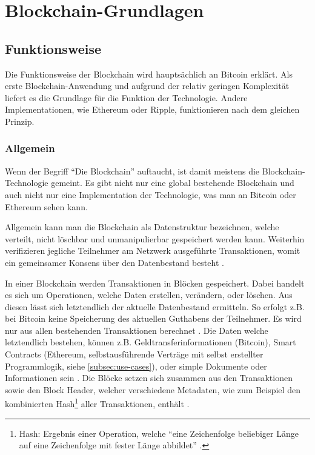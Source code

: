 \chapter{Blockchain-Grundlagen}
\label{cha:grundlagen}

\section{Funktionsweise}
Die Funktionsweise der Blockchain wird hauptsächlich an Bitcoin erklärt. Als erste Blockchain-Anwendung \cite{ZhengBlockchainChallengesOpportunities2017} und aufgrund der relativ geringen Komplexität liefert es die Grundlage für die Funktion der Technologie. Andere Implementationen, wie Ethereum oder Ripple, funktionieren nach dem gleichen Prinzip.

\subsection{Allgemein}
Wenn der Begriff ``Die Blockchain'' auftaucht, ist damit meistens die Blockchain-Technologie gemeint. Es gibt nicht nur eine global bestehende Blockchain und auch nicht nur eine Implementation der Technologie, was man an Bitcoin oder Ethereum sehen kann.

Allgemein kann man die Blockchain als Datenstruktur bezeichnen, welche verteilt, nicht löschbar und unmanipulierbar gespeichert werden kann. Weiterhin verifizieren jegliche Teilnehmer am Netzwerk ausgeführte Transaktionen, womit ein gemeinsamer Konsens über den Datenbestand besteht \cite{CrosbyBlockChainTechnologyBitcoin2016}.

In einer Blockchain werden Transaktionen in Blöcken gespeichert. Dabei handelt es sich um Operationen, welche Daten erstellen, verändern, oder löschen. Aus diesen lässt sich letztendlich der aktuelle Datenbestand ermitteln. So erfolgt z.B. bei Bitcoin keine Speicherung des aktuellen Guthabens der Teilnehmer. Es wird nur aus allen bestehenden Transaktionen berechnet \cite{AntonopoulosMasteringbitcoin2015}. Die Daten welche letztendlich bestehen, können z.B. Geldtransferinformationen (Bitcoin), Smart Contracts (Ethereum, selbstausführende Verträge mit selbst erstellter Programmlogik, siehe \ref{subsec:use-cases}), oder simple Dokumente oder Informationen sein \cite{EthereumTeamEthereumWhitePaper2017}\cite{NakamotoBitcoinPeertoPeerElectronic2008}\cite{HyperledgerFabricTeamHyperledgerWhitepaper2016}. Die Blöcke setzen sich zusammen aus den Transaktionen sowie den Block Header, welcher verschiedene Metadaten, wie zum Beispiel den kombinierten Hash\footnote{Hash: Ergebnis einer Operation, welche ``eine Zeichenfolge beliebiger Länge auf eine Zeichenfolge mit fester Länge abbildet'' \cite{AntonopoulosMasteringbitcoin2015}.} aller Transaktionen, enthält \cite{AntonopoulosMasteringbitcoin2015}.

